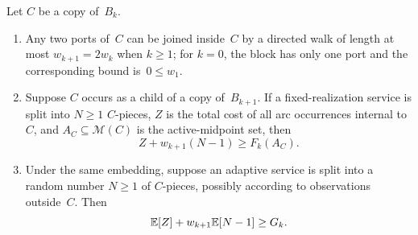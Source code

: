 \documentclass[12pt,a4paper,oneside]{report}
\begin{document}
\begin{lemma}\label{lem:block-excursions}
Let $C$ be a copy of~$B_k$.
\begin{enumerate}
    \item Any two ports of~$C$ can be joined inside~$C$ by a directed walk of
    length at most $w_{k+1}=2w_k$ when $k\ge1$; for $k=0$, the block has only
    one port and the corresponding bound is~$0\le w_1$.
    \item Suppose $C$ occurs as a child of a copy of~$B_{k+1}$.  If a
    fixed-realization service is split into $N\ge1$ $C$-pieces, $Z$ is the
    total cost of all arc occurrences internal to~$C$, and
    $A_C\subseteq\mathcal M(C)$ is the active-midpoint set, then
    \begin{equation}\label{eq:post-excursion}
        Z+w_{k+1}(N-1)\ge F_k(A_C).
    \end{equation}
    \item Under the same embedding, suppose an adaptive service is split into
    a random number $N\ge1$ of $C$-pieces, possibly according to observations
    outside~$C$.  Then
    \begin{equation}\label{eq:adapt-excursion}
        \mathbb{E}[Z]+w_{k+1}\mathbb{E}[N-1]\ge G_k.
    \end{equation}
\end{enumerate}
\end{lemma}
\end{document}
